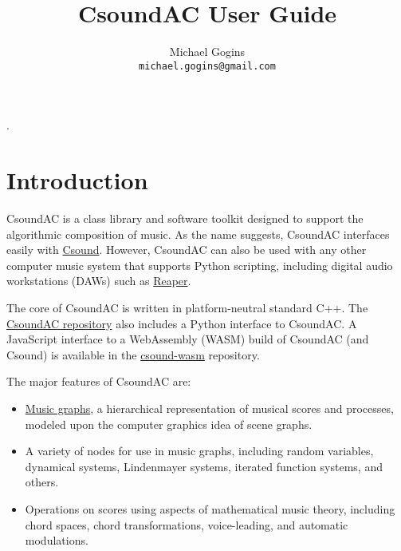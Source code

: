 \documentclass[letterpaper,10pt]{scrartcl}
\begin{document}
.

\title{CsoundAC User Guide}
\author{Michael Gogins \\ \texttt{michael.gogins@gmail.com}}
\maketitle

\section{Introduction}

CsoundAC is a class library and software toolkit designed to support the algorithmic composition of music. As the name suggests, CsoundAC interfaces easily with \href{https://csound.com/}{ Csound}. However, CsoundAC can also be used with any other computer music system that supports Python scripting, including digital audio workstations (DAWs) such as \href{https://www.reaper.fm/}{Reaper}.

The core of CsoundAC is written in platform-neutral standard C++. The \href{https://github.com/gogins/csound-ac}{CsoundAC repository} also includes a Python interface to CsoundAC. A JavaScript interface to a WebAssembly (WASM) build of CsoundAC (and Csound) is available in the \href{https://github.com/gogins/csound-wasm}{csound-wasm} repository. 

The major features of CsoundAC are:

\begin{itemize}
\item  \href{https://quod.lib.umich.edu/i/icmc/bbp2372.1998.298/1}{Music graphs}, a hierarchical representation of musical scores and processes, modeled upon the computer graphics idea of scene graphs. 

\item A variety of nodes for use in music graphs, including random variables, dynamical systems, Lindenmayer systems, iterated function systems, and others.

\item Operations on scores using aspects of mathematical music theory, including chord spaces, chord transformations, voice-leading, and automatic modulations. 
\end{itemize}
\end{document}
